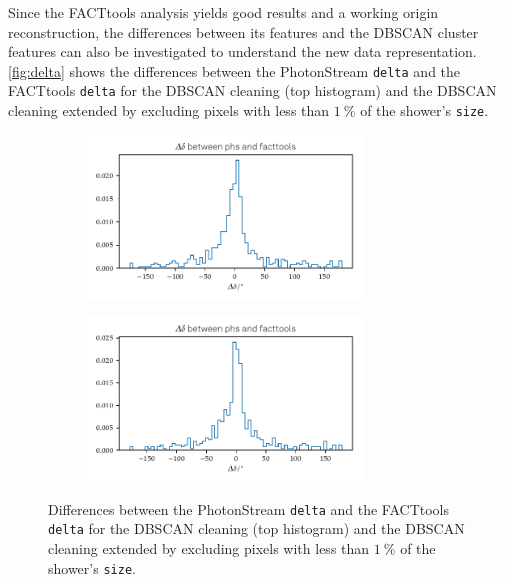 Since the FACTtools analysis yields good results and a working origin
reconstruction, the differences between its features and the DBSCAN cluster
features can also be investigated to understand the new data representation.
\autoref{fig:delta} shows the differences between the PhotonStream
\texttt{delta} and the FACTtools \texttt{delta} for the DBSCAN cleaning (top
histogram) and the DBSCAN cleaning extended by excluding pixels with less
than $\SI{1}{\percent}$ of the shower's \texttt{size}.
%
\begin{figure}
  \begin{subfigure}{\textwidth}
    \centering
    \includegraphics[width=0.8\textwidth]{Plots/delta_delta/delta_diff_hist_different_cleanings_DBSCAN_delta_20131104_162.pdf}
  \end{subfigure}
  \begin{subfigure}{\textwidth}
    \centering
    \includegraphics[width=0.8\textwidth]{Plots/delta_delta/delta_diff_hist_perc_DBSCAN_delta_20131104_162.pdf}
  \end{subfigure}
  \caption{Differences between the PhotonStream \texttt{delta} and the FACTtools \texttt{delta} for the DBSCAN cleaning (top histogram) and the DBSCAN cleaning extended by excluding pixels with less than $\SI{1}{\percent}$ of the shower's \texttt{size}.}
  \label{fig:delta}
\end{figure}
